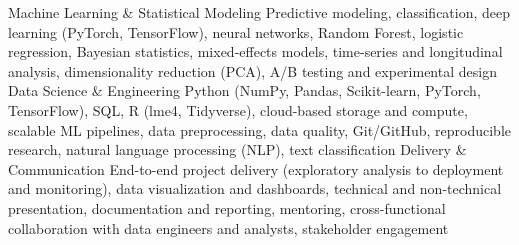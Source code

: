 {}

\begin{cvskills}

\cvskill
    {Machine Learning \& Statistical Modeling} %
    {Predictive modeling, classification, deep learning (PyTorch, TensorFlow), neural networks, Random Forest, logistic regression, Bayesian statistics, mixed-effects models, time-series and longitudinal analysis, dimensionality reduction (PCA), A/B testing and experimental design} %
\cvskill
    {Data Science \& Engineering} %
    {Python (NumPy, Pandas, Scikit-learn, PyTorch, TensorFlow), SQL, R (lme4, Tidyverse), cloud-based storage and compute, scalable ML pipelines, data preprocessing, data quality, Git/GitHub, reproducible research, natural language processing (NLP), text classification} %
\cvskill
    {Delivery \& Communication} %
    {End-to-end project delivery (exploratory analysis to deployment and monitoring), data visualization and dashboards, technical and non-technical presentation, documentation and reporting, mentoring, cross-functional collaboration with data engineers and analysts, stakeholder engagement} %

\end{cvskills}
